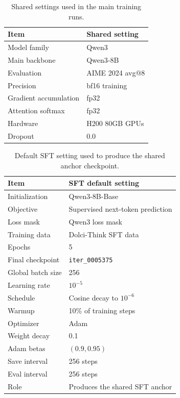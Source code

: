 \begin{table}[H]
\centering
\small
\setlength{\tabcolsep}{4pt}
\renewcommand{\arraystretch}{1.08}
\begin{tabularx}{\linewidth}{@{}lX@{}}
\toprule
\textbf{Item} & \textbf{Shared setting} \\
\midrule
Model family & Qwen3 \\
Main backbone & Qwen3-8B \\
Evaluation & AIME 2024 avg@8 \\
Precision & bf16 training \\
Gradient accumulation & fp32 \\
Attention softmax & fp32 \\
Hardware & H200 80GB GPUs \\
Dropout & 0.0 \\
\bottomrule
\end{tabularx}
\caption{Shared settings used in the main training runs.}
\label{tab:shared-training-setup}
\end{table}

\begin{table}[H]
\centering
\small
\setlength{\tabcolsep}{4pt}
\renewcommand{\arraystretch}{1.08}
\begin{tabularx}{\linewidth}{@{}lX@{}}
\toprule
\textbf{Item} & \textbf{SFT default setting} \\
\midrule
Initialization & Qwen3-8B-Base \\
Objective & Supervised next-token prediction \\
Loss mask & Qwen3 loss mask \\
Training data & Dolci-Think SFT data\\
Epochs & 5 \\
Final checkpoint & \texttt{iter\_0005375} \\
Global batch size & 256 \\
Learning rate & $10^{-5}$ \\
Schedule & Cosine decay to $10^{-6}$ \\
Warmup & 10\% of training steps \\
Optimizer & Adam \\
Weight decay & 0.1 \\
Adam betas & $(0.9,0.95)$ \\
Save interval & 256 steps \\
Eval interval & 256 steps \\
Role & Produces the shared SFT anchor \\
\bottomrule
\end{tabularx}
\caption{Default SFT setting used to produce the shared anchor checkpoint.}
\label{tab:sft-default-setting}
\end{table}

